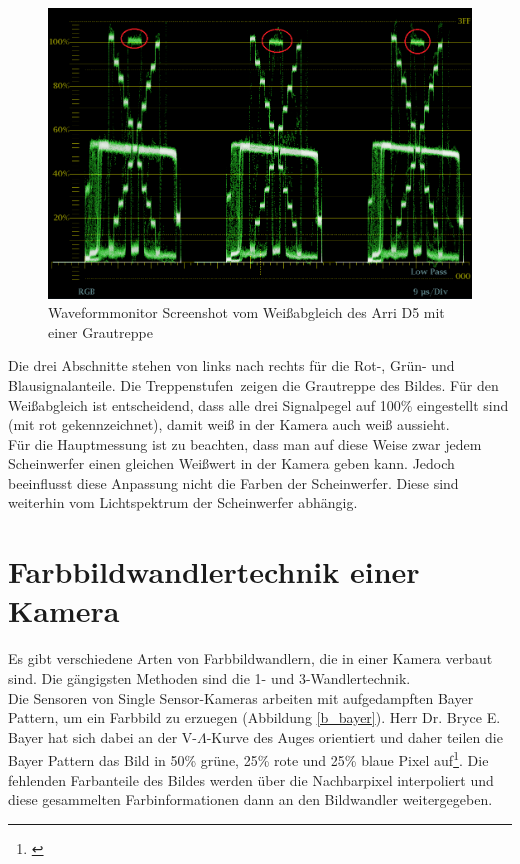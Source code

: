 \begin{figure}[H]     %
\centering
\includegraphics[width=1.0\textwidth]{bilder/arri} 
\caption {Waveformmonitor Screenshot vom Weißabgleich des Arri D5 mit einer Grautreppe}\label{b_wb}
\end{figure}


\noindent Die drei Abschnitte stehen von links nach rechts für die Rot-, Grün- und Blausignalanteile. Die \glqq Treppenstufen\grqq\ zeigen die Grautreppe des Bildes. Für den Weißabgleich ist entscheidend, dass alle drei Signalpegel auf 100\% eingestellt sind (mit rot gekennzeichnet), damit weiß in der Kamera auch weiß aussieht. \\
Für die Hauptmessung ist zu beachten, dass man auf diese Weise zwar jedem Scheinwerfer einen gleichen Weißwert in der Kamera geben kann. Jedoch beeinflusst diese Anpassung nicht die Farben der Scheinwerfer. Diese sind weiterhin vom Lichtspektrum der Scheinwerfer abhängig.

\section{Farbbildwandlertechnik einer Kamera}
\label{sec_wandler}
Es gibt verschiedene Arten von Farbbildwandlern, die in einer Kamera verbaut sind. Die gängigsten Methoden sind die 1- und 3-Wandlertechnik.\\
Die Sensoren von \glqq Single Sensor\grqq -Kameras arbeiten mit aufgedampften Bayer Pattern, um ein Farbbild zu erzuegen (Abbildung \ref{b_bayer}). Herr Dr. Bryce E. Bayer hat sich dabei an der V-$\Lambda$-Kurve des Auges orientiert und daher teilen die Bayer Pattern das Bild in 50\% grüne, 25\% rote und 25\% blaue Pixel auf\footnote{\cite{itwissen}}. Die fehlenden Farbanteile des Bildes werden über die Nachbarpixel interpoliert und diese gesammelten Farbinformationen dann an den Bildwandler weitergegeben.

